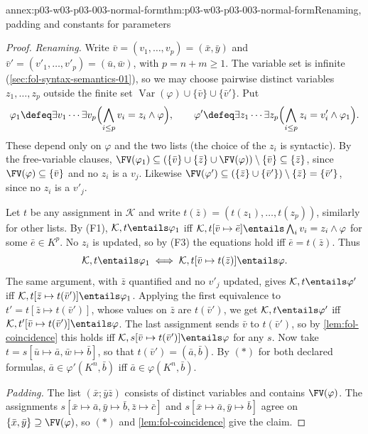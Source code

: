 \begin{annexitem}{annex:p03-w03-p03-003-normal-form}{thm:p03-w03-p03-003-normal-form}{Renaming, padding and constants for parameters}
\begin{proof}
\emph{Renaming.}  Write \(\bar v=(v_1,\ldots,v_p)=(\bar x,\bar y)\) and
\(\bar v'=(v'_1,\ldots,v'_p)=(\bar u,\bar w)\), with \(p=n+m\geq1\).  The
variable set is infinite (\cref{sec:fol-syntax-semantics-01}), so we may
choose pairwise distinct variables \(z_1,\ldots,z_p\) outside the finite set
\(\operatorname{Var}(\varphi)\cup\{\bar v\}\cup\{\bar v'\}\).  Put
\[
 \varphi_1\defeq\exists v_1\cdots\exists v_p
   \Bigl(\bigwedge_{i\leq p}v_i=z_i\land\varphi\Bigr),\qquad
 \varphi'\defeq\exists z_1\cdots\exists z_p
   \Bigl(\bigwedge_{i\leq p}z_i=v'_i\land\varphi_1\Bigr).
\]
These depend only on \(\varphi\) and the two lists (the choice of the
\(z_i\) is syntactic).  By the free-variable clauses,
\(\FV(\varphi_1)\subseteq(\{\bar v\}\cup\{\bar z\}\cup\FV(\varphi))
\setminus\{\bar v\}\subseteq\{\bar z\}\), since
\(\FV(\varphi)\subseteq\{\bar v\}\) and no \(z_i\) is a \(v_j\).  Likewise
\(\FV(\varphi')\subseteq(\{\bar z\}\cup\{\bar v'\})\setminus\{\bar z\}
=\{\bar v'\}\), since no \(z_i\) is a \(v'_j\).

Let \(t\) be any assignment in \(\mathcal K\) and write
\(t(\bar z)=(t(z_1),\ldots,t(z_p))\), similarly for other lists.  By (F1),
\(\mathcal K,t\entails\varphi_1\) iff
\(\mathcal K,t[\bar v\mapsto\bar e]\entails\bigwedge_iv_i=z_i\land\varphi\)
for some \(\bar e\in K^p\).  No \(z_i\) is updated, so by (F3) the equations
hold iff \(\bar e=t(\bar z)\).  Thus
\[
 \mathcal K,t\entails\varphi_1\iff
 \mathcal K,t[\bar v\mapsto t(\bar z)]\entails\varphi .
\]
The same argument, with \(\bar z\) quantified and no \(v'_j\) updated, gives
\(\mathcal K,t\entails\varphi'\) iff
\(\mathcal K,t[\bar z\mapsto t(\bar v')]\entails\varphi_1\).  Applying the
first equivalence to \(t'=t[\bar z\mapsto t(\bar v')]\), whose values on
\(\bar z\) are \(t(\bar v')\), we get
\(\mathcal K,t\entails\varphi'\) iff
\(\mathcal K,t'[\bar v\mapsto t(\bar v')]\entails\varphi\).  The last
assignment sends \(\bar v\) to \(t(\bar v')\), so by
\cref{lem:fol-coincidence} this holds iff
\(\mathcal K,s[\bar v\mapsto t(\bar v')]\entails\varphi\) for any \(s\).
Now take \(t=s[\bar u\mapsto\bar a,\bar w\mapsto\bar b]\), so that
\(t(\bar v')=(\bar a,\bar b)\).  By \((\ast)\) for both declared formulas,
\(\bar a\in\varphi'(K^n,\bar b)\) iff \(\bar a\in\varphi(K^n,\bar b)\).

\emph{Padding.}  The list \((\bar x;\bar y\bar z)\) consists of distinct
variables and contains \(\FV(\varphi)\).  The assignments
\(s[\bar x\mapsto\bar a,\bar y\mapsto\bar b,\bar z\mapsto\bar c]\) and
\(s[\bar x\mapsto\bar a,\bar y\mapsto\bar b]\) agree on
\(\{\bar x,\bar y\}\supseteq\FV(\varphi)\), so \((\ast)\) and
\cref{lem:fol-coincidence} give the claim.


\end{proof}
\end{annexitem}
